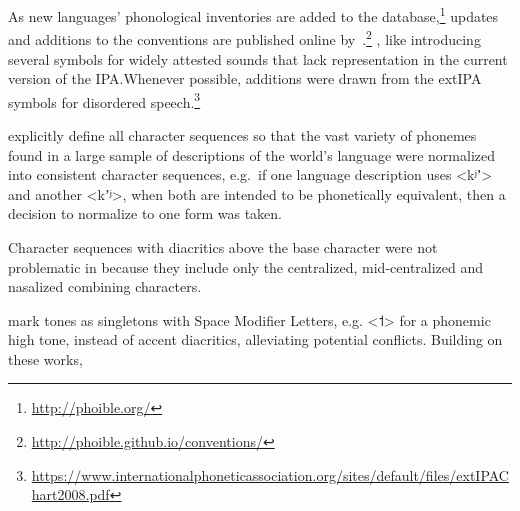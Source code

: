 As new languages' phonological inventories are added to the 
database,\footnote{\url{http://phoible.org/}} updates and additions to the 
conventions are published online by~\cite{MoranMcCloy2014}.\footnote{
\url{http://phoible.github.io/conventions/}} , like 
introducing several symbols for widely attested sounds that lack representation 
in the current version of the IPA.\@ Whenever possible, additions were drawn from 
the extIPA symbols for disordered speech.\footnote{\url{https://www.internationalphoneticassociation.org/sites/default/files/extIPAChart2008.pdf}}

\cite{MoranMcCloy2014} explicitly define all character sequences so that the
vast variety of phonemes found in a large sample of descriptions of the world's
language were normalized into consistent character sequences, e.g.~if one
language description uses <kʲʼ> and another <kʼʲ>, when both are intended to be
phonetically equivalent, then a decision to normalize to one form was taken. 

Character sequences with diacritics above the base character were not
problematic in \citet{Moran2012} because they include only the centralized,
mid-centralized and nasalized combining characters. 

\citet{Moran2012;MoranMcCloy2014} mark tones as singletons with Space Modifier
Letters, e.g. <˦> for a phonemic high tone, instead of accent diacritics,
alleviating potential conflicts. Building on these works, 
